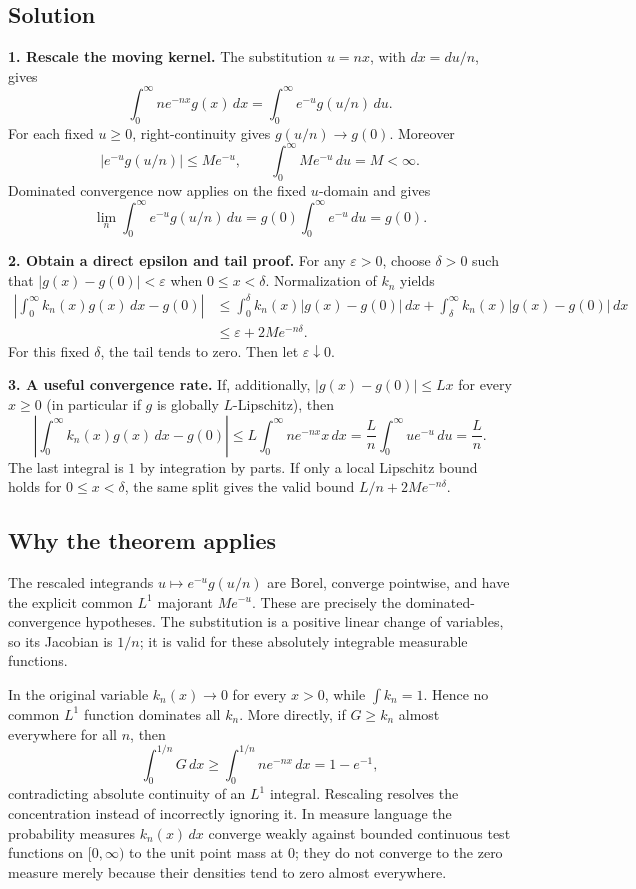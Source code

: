 \documentclass[
  11pt,
]{article}
\begin{document}
\subsection{Solution}\label{solution-15}

\textbf{1. Rescale the moving kernel.} The substitution \(u=nx\), with
\(dx=du/n\), gives \[
\int_0^{\infty}ne^{-nx}g(x)\,dx
=\int_0^{\infty}e^{-u}g(u/n)\,du.
\] For each fixed \(u\ge0\), right-continuity gives \(g(u/n)\to g(0)\).
Moreover \[
|e^{-u}g(u/n)|\le Me^{-u},\qquad
\int_0^{\infty}Me^{-u}\,du=M<\infty.
\] Dominated convergence now applies on the fixed \(u\)-domain and gives
\[
\lim_n\int_0^{\infty}e^{-u}g(u/n)\,du
=g(0)\int_0^{\infty}e^{-u}\,du=g(0).
\]

\textbf{2. Obtain a direct epsilon and tail proof.} For any
\(\varepsilon>0\), choose \(\delta>0\) such that
\(|g(x)-g(0)|<\varepsilon\) when \(0\le x<\delta\). Normalization of
\(k_n\) yields \[
\begin{aligned}
\left|\int_0^{\infty}k_n(x)g(x)\,dx-g(0)\right|
&\le\int_0^\delta k_n(x)|g(x)-g(0)|\,dx
 +\int_\delta^{\infty}k_n(x)|g(x)-g(0)|\,dx\\
&\le\varepsilon+2M e^{-n\delta}.
\end{aligned}
\] For this fixed \(\delta\), the tail tends to zero. Then let
\(\varepsilon\downarrow0\).

\textbf{3. A useful convergence rate.} If, additionally,
\(|g(x)-g(0)|\le Lx\) for every \(x\ge0\) (in particular if \(g\) is
globally \(L\)-Lipschitz), then \[
\left|\int_0^{\infty}k_n(x)g(x)\,dx-g(0)\right|
\le L\int_0^{\infty}ne^{-nx}x\,dx
=\frac Ln\int_0^{\infty}ue^{-u}\,du=\frac Ln.
\] The last integral is \(1\) by integration by parts. If only a local
Lipschitz bound holds for \(0\le x<\delta\), the same split gives the
valid bound \(L/n+2Me^{-n\delta}\).

\subsection{Why the theorem applies}\label{why-the-theorem-applies-15}

The rescaled integrands \(u\mapsto e^{-u}g(u/n)\) are Borel, converge
pointwise, and have the explicit common \(L^1\) majorant \(Me^{-u}\).
These are precisely the dominated-convergence hypotheses. The
substitution is a positive linear change of variables, so its Jacobian
is \(1/n\); it is valid for these absolutely integrable measurable
functions.

In the original variable \(k_n(x)\to0\) for every \(x>0\), while
\(\int k_n=1\). Hence no common \(L^1\) function dominates all \(k_n\).
More directly, if \(G\ge k_n\) almost everywhere for all \(n\), then \[
\int_0^{1/n}G\,dx\ge\int_0^{1/n}ne^{-nx}\,dx=1-e^{-1},
\] contradicting absolute continuity of an \(L^1\) integral. Rescaling
resolves the concentration instead of incorrectly ignoring it. In
measure language the probability measures \(k_n(x)\,dx\) converge weakly
against bounded continuous test functions on \([0,\infty)\) to the unit
point mass at \(0\); they do not converge to the zero measure merely
because their densities tend to zero almost everywhere.
\end{document}
